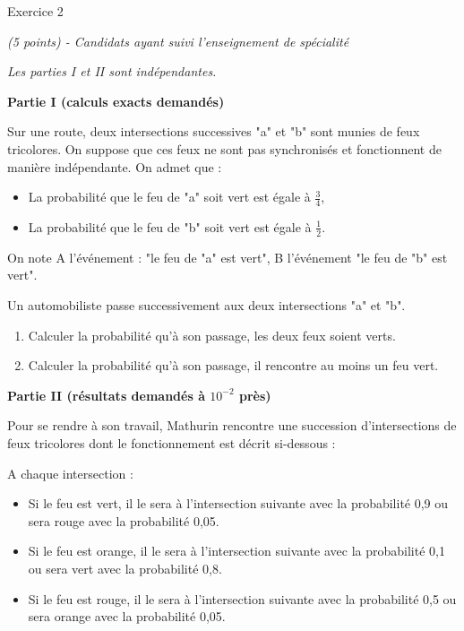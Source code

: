 
%
\begin{h2}Exercice 2\end{h2}
\textit{(5 points) - Candidats ayant suivi l'enseignement de spécialité}
\par
\textit{Les parties I et II sont indépendantes.}
\par
\textbf{Partie I (calculs exacts demandés)}
\par
Sur une route, deux intersections successives "a" et "b" sont munies de feux tricolores. On suppose que ces feux ne sont pas synchronisés et fonctionnent de manière indépendante. On admet que :
\begin{itemize}
     \item
     La probabilité que le feu de "a" soit vert est égale à $\frac{3}{4}$,
     \item
     La probabilité que le feu de "b" soit vert est égale à $\frac{1}{2}$.
\end{itemize}
On note A l'événement : "le feu de "a" est vert", B l'événement "le feu de "b" est vert".
\par
Un automobiliste passe successivement aux deux intersections "a" et "b".
\begin{enumerate}
     \item
     Calculer la probabilité qu'à son passage, les deux feux soient verts.
     \item
     Calculer la probabilité qu'à son passage, il rencontre au moins un feu vert.
\end{enumerate}
\par
\textbf{Partie II (résultats demandés à $10^{-2}$ près)}
\par
Pour se rendre à son travail, Mathurin rencontre une succession d'intersections de feux tricolores dont le fonctionnement est décrit si-dessous :
\par
A chaque intersection :
\begin{itemize}
     \item
     Si le feu est vert, il le sera à l'intersection suivante avec la probabilité 0,9 ou sera rouge avec la probabilité 0,05.
     \item
     Si le feu est orange, il le sera à l'intersection suivante avec la probabilité 0,1 ou sera vert avec la probabilité 0,8.
     \item
     Si le feu est rouge, il le sera à l'intersection suivante avec la probabilité 0,5 ou sera orange avec la probabilité 0,05.
\end{itemize}
